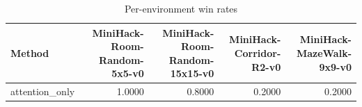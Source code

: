 \begin{table}[htbp]
\centering
\caption{Per-environment win rates}
\label{tab:per-env}
\begin{tabular}{lrrrr}
\toprule
\textbf{Method} & \textbf{MiniHack-Room-Random-5x5-v0} & \textbf{MiniHack-Room-Random-15x15-v0} & \textbf{MiniHack-Corridor-R2-v0} & \textbf{MiniHack-MazeWalk-9x9-v0} \\
\midrule
attention\_only & 1.0000 & 0.8000 & 0.2000 & 0.2000 \\
\bottomrule
\end{tabular}
\end{table}